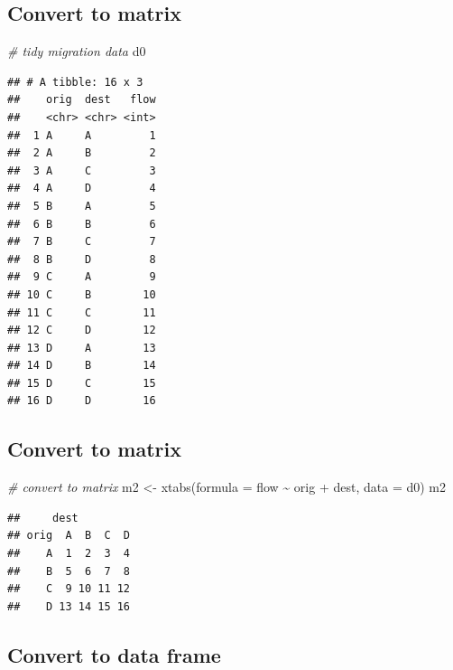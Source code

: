 \documentclass[
]{book}
\newenvironment{Shaded}{\begin{snugshade}}{\end{snugshade}}
\newcommand{\AttributeTok}[1]{\textcolor[rgb]{0.77,0.63,0.00}{#1}}
\newcommand{\CommentTok}[1]{\textcolor[rgb]{0.56,0.35,0.01}{\textit{#1}}}
\newcommand{\FunctionTok}[1]{\textcolor[rgb]{0.00,0.00,0.00}{#1}}
\newcommand{\NormalTok}[1]{#1}
\newcommand{\OtherTok}[1]{\textcolor[rgb]{0.56,0.35,0.01}{#1}}
\newcommand{\SpecialCharTok}[1]{\textcolor[rgb]{0.00,0.00,0.00}{#1}}
\begin{document}
\hypertarget{convert-to-matrix-1}{%
\subsection{Convert to matrix}\label{convert-to-matrix-1}}

\begin{Shaded}
\begin{Highlighting}[]
\CommentTok{\# tidy migration data}
\NormalTok{d0}
\end{Highlighting}
\end{Shaded}

\begin{verbatim}
## # A tibble: 16 x 3
##    orig  dest   flow
##    <chr> <chr> <int>
##  1 A     A         1
##  2 A     B         2
##  3 A     C         3
##  4 A     D         4
##  5 B     A         5
##  6 B     B         6
##  7 B     C         7
##  8 B     D         8
##  9 C     A         9
## 10 C     B        10
## 11 C     C        11
## 12 C     D        12
## 13 D     A        13
## 14 D     B        14
## 15 D     C        15
## 16 D     D        16
\end{verbatim}

\hypertarget{convert-to-matrix-2}{%
\subsection{Convert to matrix}\label{convert-to-matrix-2}}

\begin{Shaded}
\begin{Highlighting}[]
\CommentTok{\# convert to matrix}
\NormalTok{m2 }\OtherTok{\textless{}{-}} \FunctionTok{xtabs}\NormalTok{(}\AttributeTok{formula =}\NormalTok{ flow }\SpecialCharTok{\textasciitilde{}}\NormalTok{ orig }\SpecialCharTok{+}\NormalTok{ dest, }\AttributeTok{data =}\NormalTok{ d0)}
\NormalTok{m2}
\end{Highlighting}
\end{Shaded}

\begin{verbatim}
##     dest
## orig  A  B  C  D
##    A  1  2  3  4
##    B  5  6  7  8
##    C  9 10 11 12
##    D 13 14 15 16
\end{verbatim}

\hypertarget{convert-to-data-frame}{%
\subsection{Convert to data frame}\label{convert-to-data-frame}}
\end{document}
